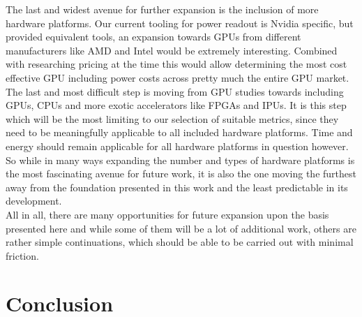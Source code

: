 The last and widest avenue for further expansion is the inclusion of more hardware platforms. Our current tooling for power readout is Nvidia specific, but provided equivalent tools, an expansion towards GPUs from different manufacturers like AMD and Intel would be extremely interesting. Combined with researching pricing at the time this would allow determining the most cost effective GPU including power costs across pretty much the entire GPU market. The last and most difficult step is moving from GPU studies towards including GPUs, CPUs and more exotic accelerators like FPGAs and IPUs. It is this step which will be the most limiting to our selection of suitable metrics, since they need to be meaningfully applicable to all included hardware platforms. Time and energy should remain applicable for all hardware platforms in question however. So while in many ways expanding the number and types of hardware platforms is the most fascinating avenue for future work, it is also the one moving the furthest away from the foundation presented in this work and the least predictable in its development. \\
All in all, there are many opportunities for future expansion upon the basis presented here and while some of them will be a lot of additional work, others are rather simple continuations, which should be able to be carried out with minimal friction.

\section{Conclusion}














